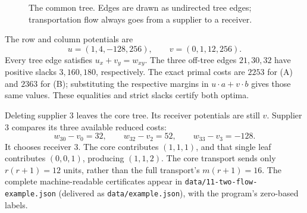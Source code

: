 \documentclass[11pt]{article}
\numberwithin{equation}{section}
\theoremstyle{definition}
\begin{document}
\begin{figure}[htbp]\centering
{}
\caption{The common tree. Edges are drawn as undirected tree edges;
transportation flow always goes from a supplier to a receiver.}
\label{tf:fig:tree}
\end{figure}

The row and column potentials are
\begin{equation}
 u=(1,4,-128,256),\qquad v=(0,1,12,256).
 \label{tf:eq:examplepotentials}
\end{equation}
Every tree edge satisfies $u_x+v_y=w_{xy}$. The three off-tree edges
$21,30,32$ have positive slacks $3,160,180$, respectively. The exact
primal costs are $2253$ for (A) and $2363$ for (B); substituting the
respective margins in $u\cdot a+v\cdot b$ gives those same values.
These equalities and strict slacks certify both optima.

Deleting supplier $3$ leaves the core tree. Its receiver potentials are
still $v$. Supplier $3$ compares its three available reduced costs:
\[
 w_{30}-v_0=32,\qquad w_{32}-v_2=52,\qquad w_{33}-v_3=-128.
\]
It chooses receiver $3$. The core contributes $(1,1,1)$, and that single
leaf contributes $(0,0,1)$, producing $(1,1,2)$. The core transport sends
only $r(r+1)=12$ units, rather than the full transport's $m(r+1)=16$.
The complete machine-readable certificates appear in
\nolinkurl{data/11-two-flow-example.json} (delivered as
\nolinkurl{data/example.json}), with the program's zero-based labels.
\end{document}
